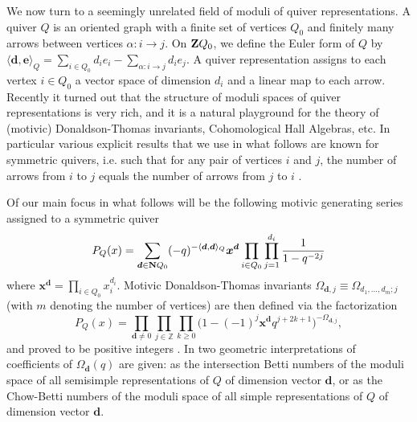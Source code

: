 \documentclass[
 reprint,
 amsmath,amssymb,
 aps,prl
]{revtex4-1}
\newcommand{\be}{\begin{equation}}
\newcommand{\ee}{\end{equation}}
\begin{document}
We now turn to a seemingly unrelated field of moduli of quiver representations. A quiver $Q$ is an oriented graph with a finite set of vertices $Q_0$ and finitely many arrows between vertices $\alpha:i\rightarrow j$. On ${\bf Z}Q_0$, we define the Euler form of $Q$ by
$\langle {\bm d},{\bm e}\rangle_Q=\sum_{i\in Q_0}d_ie_i-\sum_{\alpha:i\rightarrow j}d_ie_j.$
A quiver representation assigns to each vertex $i\in Q_0$ a vector space of dimension $d_i$ and a linear map to each arrow. Recently it turned out that the structure of moduli spaces of quiver representations is very rich, and it is a natural playground for the theory of (motivic) Donaldson-Thomas invariants, Cohomological Hall Algebras, etc.  
In particular various explicit results that we use in what follows are known for symmetric quivers, i.e. such that for any pair of vertices $i$ and $j$, the number of arrows from $i$ to $j$ equals the number of arrows from $j$ to $i$ \cite{Kontsevich:2010px,efimov2012,FR,MR}. 

Of our main focus in what follows will be the following motivic generating series assigned to a symmetric quiver
\be
P_Q(x)=\sum_{{\bm d}\in{\bf N}Q_0}(-q)^{-\langle {\bm d},{\bm d}\rangle_Q} {\bm x}^{\bm d} \prod_{i\in Q_0}\prod_{j=1}^{d_i}\frac{1}{1-q^{-2j}}   \label{PQx}
\ee
where ${\bm x}^{\bm d}=\prod_{i\in Q_0}x_i^{d_i}$. Motivic Donaldson-Thomas invariants $\Omega_{{\bm d},j}\equiv \Omega_{d_1,\ldots,d_m;j}$ (with $m$ denoting the number of vertices) are then defined via the factorization
\be
P_Q(x)=
\prod_{{\bm d}\neq 0} \prod_{j\in\mathbb{Z}} \prod_{k\geq 0} \big(1 - (-1)^j {\bm x}^{\bm d} q^{j+2k+1} \big)^{-\Omega_{{\bm d},j}},   \label{PQx-Omega}
\ee
and proved to be positive integers \cite{efimov2012}. In \cite{MR,FR} two geometric interpretations of coefficients of $\Omega_{\bm d}(q)$ are given: as the intersection Betti numbers of the moduli space of all semisimple representations of $Q$ of dimension vector ${\bm d}$, or as the Chow-Betti numbers of the moduli space of all simple representations of $Q$ of dimension vector ${\bm d}$.
\end{document}
